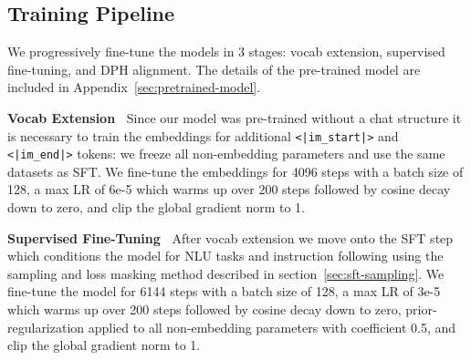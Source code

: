 
\subsection{Training Pipeline}
We progressively fine-tune the models in 3 stages: vocab extension, supervised fine-tuning, and DPH alignment. The details of the pre-trained model are included in Appendix~\ref{sec:pretrained-model}.

\textbf{Vocab Extension\ } Since our model was pre-trained without a chat structure it is necessary to train the embeddings for additional \texttt{<|im\_start|>} and \texttt{<|im\_end|>} tokens: we freeze all non-embedding parameters and use the same datasets as SFT. We fine-tune the embeddings for 4096 steps with a batch size of 128, a max LR of 6e-5 which warms up over 200 steps followed by cosine decay down to zero, and clip the global gradient norm to 1.

\textbf{Supervised Fine-Tuning\ } After vocab extension we move onto the SFT step which conditions the model for NLU tasks and instruction following using the sampling and loss masking method described in section~\ref{sec:sft-sampling}. We fine-tune the model for 6144 steps with a batch size of 128, a max LR of 3e-5 which warms up over 200 steps followed by cosine decay down to zero, prior-regularization applied to all non-embedding parameters with coefficient 0.5, and clip the global gradient norm to 1.

